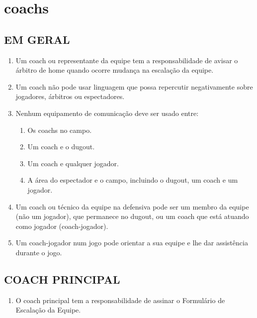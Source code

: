 \section{\Glspl{coach} }
	\begin{multicols}{2} 
		\subsection{EM GERAL}
		
		\begin{enumerate}[label=\alph*)]
			\item Um \gls{coach} ou representante da equipe tem a responsabilidade de avisar o \'arbitro de \gls{home} quando ocorre mudan\c{c}a na escala\c{c}\~ao da equipe. 
			
			\item  Um \gls{coach} n\~ao pode usar linguagem que possa repercutir negativamente sobre 
			jogadores, \'arbitros ou espectadores. 
			
			\item  Nenhum equipamento de comunica\c{c}\~ao deve ser usado entre: 
			\begin{enumerate}[label=\roman* -]
				\item Os \glspl{coach} no campo. 
				\item Um \gls{coach} e o \Gls{dugout}. 
				\item Um \gls{coach} e qualquer jogador. 
				\item A \'area do espectador e o campo, incluindo o \Gls{dugout}, um \gls{coach} e um jogador. 
			\end{enumerate}
			\item  Um \gls{coach} ou t\'ecnico da equipe na defensiva pode ser um membro da equipe (n\~ao um jogador), que permanece no \Gls{dugout}, ou um \gls{coach} que est\'a atuando como jogador (\gls{coach}-jogador). 
			
			\item  Um \gls{coach}-jogador num jogo pode orientar a sua equipe e lhe dar assist\^encia durante o jogo. 
		\end{enumerate}
		
		\subsection{COACH PRINCIPAL} 
		\begin{enumerate}[label=\alph*)]
			\item O \gls{coach} principal tem a responsabilidade de assinar o Formul\'ario de Escala\c{c}\~ao da Equipe. 
			

\end{enumerate}
\end{multicols}

